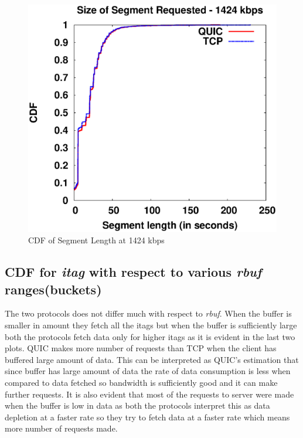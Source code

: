 \begin{figure}[!ht]
    \centering
    \includegraphics[width=0.9\linewidth]{img/CDF/plot_segment_1458176}
    \caption{CDF of Segment Length at 1424 kbps}
    \label{fig:seg761}
\end{figure}


\subsection{CDF for \textit{itag} with respect to various \textit{rbuf} ranges(buckets) }
The two protocols does not differ much with respect to \textit{rbuf}. When the buffer is smaller in amount they fetch all the itags but when the buffer is sufficiently large both the protocols fetch data only for higher itags as it is evident in the last two plots. QUIC makes more number of requests than TCP when the client has buffered large amount of data. This can be interpreted as QUIC's estimation that since buffer has large amount of data the rate of data consumption is less when compared to data fetched so bandwidth is sufficiently good and it can make further requests. It is also evident that most of the requests to server were made when the buffer is low in data as both the protocols interpret this as data depletion at a faster rate so they try to fetch data at a faster rate which means more number of requests made.


